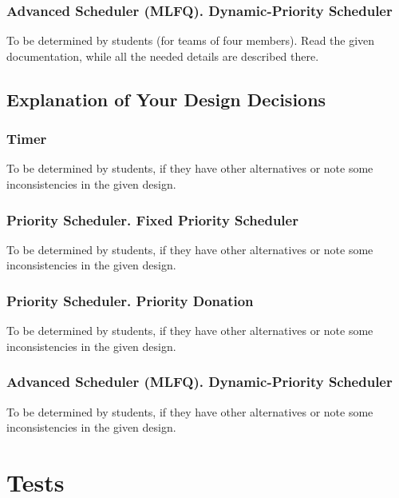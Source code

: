  
\subsubsection{Advanced Scheduler (MLFQ). Dynamic-Priority Scheduler}

To be determined by students (for teams of four members). Read the given documentation, while all the needed details are described there.

\subsection{Explanation of Your Design Decisions}

\subsubsection{Timer}

To be determined by students, if they have other alternatives or note some inconsistencies in the given design.

\subsubsection{Priority Scheduler. Fixed Priority Scheduler}

To be determined by students, if they have other alternatives or note some inconsistencies in the given design.

\subsubsection{Priority Scheduler. Priority Donation}

To be determined by students, if they have other alternatives or note some inconsistencies in the given design.

\subsubsection{Advanced Scheduler (MLFQ). Dynamic-Priority Scheduler}

To be determined by students, if they have other alternatives or note some inconsistencies in the given design.


\section{Tests}


